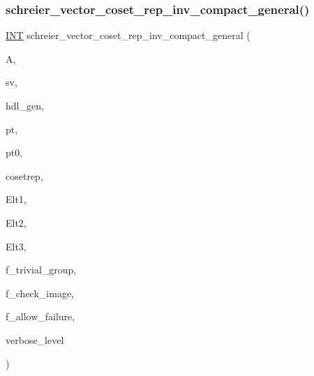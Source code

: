 \subsubsection{\texorpdfstring{schreier\+\_\+vector\+\_\+coset\+\_\+rep\+\_\+inv\+\_\+compact\+\_\+general()}{schreier\_vector\_coset\_rep\_inv\_compact\_general()}}
{\footnotesize\ttfamily \mbox{\hyperlink{galois_8h_a09fddde158a3a20bd2dcadb609de11dc}{I\+NT}} schreier\+\_\+vector\+\_\+coset\+\_\+rep\+\_\+inv\+\_\+compact\+\_\+general (\begin{DoxyParamCaption}\item[{\mbox{\hyperlink{classaction}{action}} $\ast$}]{A,  }\item[{\mbox{\hyperlink{galois_8h_a09fddde158a3a20bd2dcadb609de11dc}{I\+NT}} $\ast$}]{sv,  }\item[{\mbox{\hyperlink{galois_8h_a09fddde158a3a20bd2dcadb609de11dc}{I\+NT}} $\ast$}]{hdl\+\_\+gen,  }\item[{\mbox{\hyperlink{galois_8h_a09fddde158a3a20bd2dcadb609de11dc}{I\+NT}}}]{pt,  }\item[{\mbox{\hyperlink{galois_8h_a09fddde158a3a20bd2dcadb609de11dc}{I\+NT}} \&}]{pt0,  }\item[{\mbox{\hyperlink{galois_8h_a09fddde158a3a20bd2dcadb609de11dc}{I\+NT}} $\ast$}]{cosetrep,  }\item[{\mbox{\hyperlink{galois_8h_a09fddde158a3a20bd2dcadb609de11dc}{I\+NT}} $\ast$}]{Elt1,  }\item[{\mbox{\hyperlink{galois_8h_a09fddde158a3a20bd2dcadb609de11dc}{I\+NT}} $\ast$}]{Elt2,  }\item[{\mbox{\hyperlink{galois_8h_a09fddde158a3a20bd2dcadb609de11dc}{I\+NT}} $\ast$}]{Elt3,  }\item[{\mbox{\hyperlink{galois_8h_a09fddde158a3a20bd2dcadb609de11dc}{I\+NT}}}]{f\+\_\+trivial\+\_\+group,  }\item[{\mbox{\hyperlink{galois_8h_a09fddde158a3a20bd2dcadb609de11dc}{I\+NT}}}]{f\+\_\+check\+\_\+image,  }\item[{\mbox{\hyperlink{galois_8h_a09fddde158a3a20bd2dcadb609de11dc}{I\+NT}}}]{f\+\_\+allow\+\_\+failure,  }\item[{\mbox{\hyperlink{galois_8h_a09fddde158a3a20bd2dcadb609de11dc}{I\+NT}}}]{verbose\+\_\+level }\end{DoxyParamCaption})}

\mbox{\label{schreier__vector_8_c_a25359d4cb33dfdb9e98b06a69d60d680}} 
